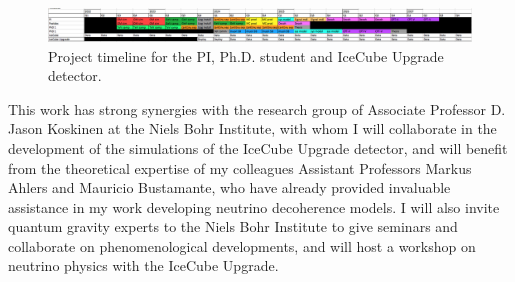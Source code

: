 \documentclass[a4paper,11pt]{article}
\begin{document}

\begin{figure}[h]
	\includegraphics[width=0.99\linewidth]{images/timeline.png}
	\caption{Project timeline for the PI, Ph.D. student and IceCube Upgrade detector.}
	\label{fig:timeline}
\end{figure}

This work has strong synergies with the research group of Associate Professor D. Jason Koskinen at the Niels Bohr Institute, with whom I will collaborate in the development of the simulations of the IceCube Upgrade detector, and will benefit from the theoretical expertise of my colleagues Assistant Professors Markus Ahlers and Mauricio Bustamante, who have already provided invaluable assistance in my work developing neutrino decoherence models. I will also invite quantum gravity experts to the Niels Bohr Institute to give seminars and collaborate on phenomenological developments, and will host a workshop on neutrino physics with the IceCube Upgrade.



\end{document}
